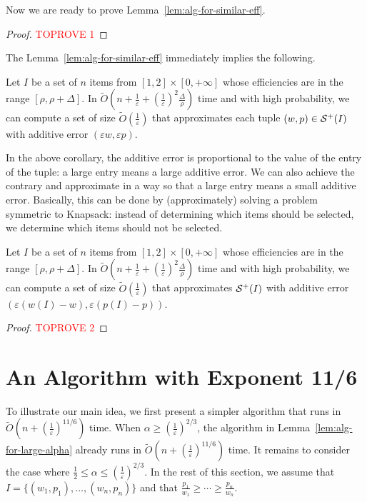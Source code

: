 \documentclass[a4paper,UKenglish,cleveref, autoref, thm-restate, pdfa]{lipics-v2021}
\newcommand{\eps}{\varepsilon}
\renewcommand{\leq}{\leqslant}
\renewcommand{\geq}{\geqslant}
\begin{document}
Now we are ready to prove Lemma~\ref{lem:alg-for-similar-eff}. \begin{proof}\textcolor{red}{TOPROVE 1}\end{proof}

The Lemma~\ref{lem:alg-for-similar-eff} immediately implies the following.
\begin{corollary}\label{coro:approx-add}
    Let $I$ be a set of $n$ items from $[1, 2] \times [0, +\infty]$ whose efficiencies are in the range $[\rho, \rho + \Delta]$. In $\tilde{O}(n + \frac{1}{\eps} + (\frac{1}{\eps})^2 \frac{\Delta}{\rho})$ time and with high probability, we can compute a set of size $\tilde{O}(\frac{1}{\eps})$ that approximates each tuple $(w,p) \in {\cal S}^+(I)$ with additive error $(\eps w, \eps p)$. 
\end{corollary}

In the above corollary, the additive error is proportional to the value of the entry of the tuple: a large entry means a large additive error. We can also achieve the contrary and approximate in a way so that a large entry means a small additive error. Basically, this can be done by (approximately) solving a problem symmetric to Knapsack: instead of determining which items should be selected, we determine which items should not be selected. 

\begin{corollary}\label{coro:approx-del}
    Let $I$ be a set of $n$ items from $[1, 2] \times [0, +\infty]$ whose efficiencies are in the range $[\rho, \rho + \Delta]$. In $\tilde{O}(n + \frac{1}{\eps} + (\frac{1}{\eps})^2 \frac{\Delta}{\rho})$ time and with high probability, we can compute a set of size $\tilde{O}(\frac{1}{\eps})$ that approximates ${\cal S}^+(I)$ with additive error $(\eps(w(I) - w), \eps(p(I) - p))$.
\end{corollary}
\begin{proof}\textcolor{red}{TOPROVE 2}\end{proof}



\section{An Algorithm with Exponent 11/6}\label{sec:weak}
To illustrate our main idea, we first present a simpler algorithm that runs in $\tilde{O}(n + (\frac{1}{\eps})^{11/6})$ time.  When $\alpha \geq (\frac{1}{\eps})^{2/3}$, the algorithm in Lemma~\ref{lem:alg-for-large-alpha} already runs in $\tilde{O}(n + (\frac{1}{\eps})^{11/6})$ time. It remains to consider the case where $\frac{1}{2}\leq \alpha \leq (\frac{1}{\eps})^{2/3}$. In the rest of this section, we assume that $I = \{(w_1, p_1), \ldots, (w_n, p_n)\}$ and that $\frac{p_1}{w_1} \geq \cdots \geq \frac{p_n}{w_n}$.
\end{document}
